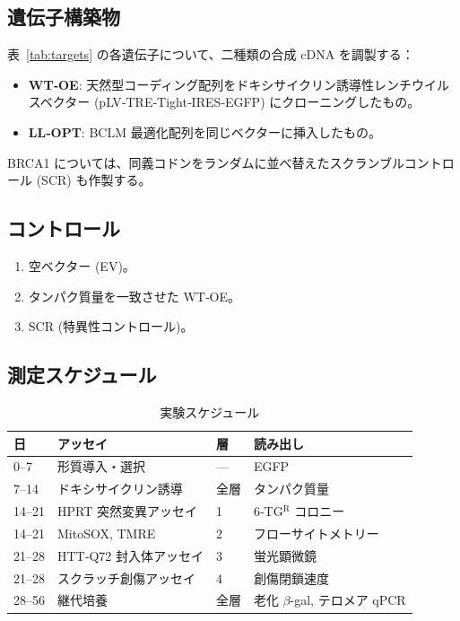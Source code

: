 \documentclass[12pt,a4paper]{ltjsarticle}
\begin{document}
	\subsection{遺伝子構築物}
	表~\ref{tab:targets} の各遺伝子について、二種類の合成 cDNA を調製する：
	\begin{itemize}
		\item \textbf{WT‑OE}: 天然型コーディング配列をドキシサイクリン誘導性レンチウイルスベクター (pLV‑TRE‑Tight‑IRES‑EGFP) にクローニングしたもの。
		\item \textbf{LL‑OPT}: BCLM 最適化配列を同じベクターに挿入したもの。
	\end{itemize}
	BRCA1 については、同義コドンをランダムに並べ替えたスクランブルコントロール (SCR) も作製する。
	
	\subsection{コントロール}
	\begin{enumerate}
		\item 空ベクター (EV)。
		\item タンパク質量を一致させた WT‑OE。
		\item SCR (特異性コントロール)。
	\end{enumerate}
	
	\subsection{測定スケジュール}
	\begin{table}[H]
		\centering
		\caption{実験スケジュール}
		\label{tab:schedule}
		\begin{tabular}{@{}llll@{}}
			\toprule
			\textbf{日} & \textbf{アッセイ} & \textbf{層} & \textbf{読み出し} \\
			\midrule
			0–7   & 形質導入・選択 & --- & EGFP \\
			7–14  & ドキシサイクリン誘導 & 全層 & タンパク質量 \\
			14–21 & HPRT 突然変異アッセイ & 1 & 6‑TG\(^{\mathrm{R}}\) コロニー \\
			14–21 & MitoSOX, TMRE & 2 & フローサイトメトリー \\
			21–28 & HTT‑Q72 封入体アッセイ & 3 & 蛍光顕微鏡 \\
			21–28 & スクラッチ創傷アッセイ & 4 & 創傷閉鎖速度 \\
			28–56 & 継代培養 & 全層 & 老化 \(\beta\)-gal, テロメア qPCR \\
			\bottomrule
		\end{tabular}
	\end{table}
	
\end{document}
